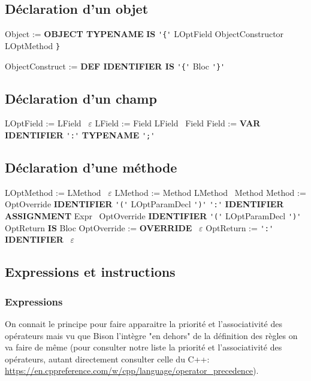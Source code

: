 \documentclass[12pt,a4paper]{article}
\begin{document}
\subsection{Déclaration d'un objet}

{\sffamily
Object := \textbf{OBJECT TYPENAME} \textbf{IS} \verb|'{'| LOptField ObjectConstructor LOptMethod \verb|}|

ObjectConstruct := \textbf{DEF IDENTIFIER IS} \verb|'{'| Bloc \verb|'}'|
}

\subsection{Déclaration d'un champ}

{\sffamily
LOptField := LField \textbar \ $\varepsilon$ \newline
LField := Field LField \textbar \ Field \newline
Field := \textbf{VAR IDENTIFIER} \verb|':'| \textbf{TYPENAME} \verb|';'|
}

\subsection{Déclaration d'une méthode}

{\sffamily\small
LOptMethod := LMethod \textbar \ $\varepsilon$ \newline
LMethod := Method LMethod \textbar \ Method \newline
Method := OptOverride \textbf{IDENTIFIER} \verb|'('| LOptParamDecl \verb|')'| \verb|':'| \textbf{IDENTIFIER ASSIGNMENT} Expr \newline
\textbar \ OptOverride \textbf{IDENTIFIER} \verb|'('| LOptParamDecl \verb|')'| OptReturn \textbf{IS} Bloc \newline
OptOverride := \textbf{OVERRIDE} \textbar \ $\varepsilon$ \newline
OptReturn := \verb|':'| \textbf{IDENTIFIER} \textbar \ $\varepsilon$
}

\subsection{Expressions et instructions}

\subsubsection{Expressions}

On connait le principe pour faire apparaitre la priorité et l'associativité des opérateurs mais vu que Bison l'intègre "en dehors" de la définition des règles on va faire de même (pour consulter notre liste la priorité et l'associativité des opérateurs, autant directement consulter celle du C++: \url{https://en.cppreference.com/w/cpp/language/operator_precedence}).
\end{document}
